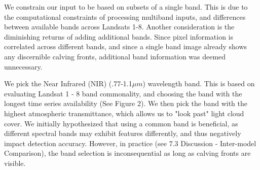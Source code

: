 \documentclass[tc, manuscript]{copernicus}
\begin{document}
We constrain our input to be based on subsets of a single band. This is due to the computational constraints of processing multiband inputs, and differences between available bands across Landsats 1-8. Another consideration is the diminishing returns of adding additional bands. Since pixel information is correlated across different bands, and since a single band image already shows any discernible calving fronts, additional band information was deemed unnecessary.

We pick the Near Infrared (NIR) (.77-1.1$\mu m$) wavelength band. This is based on evaluating  Landsat 1 - 8 band commonality, and choosing the band with the longest time series availability (See Figure 2). We then pick the band with the highest atmospheric transmittance, which allows us to "look past" light cloud cover. We initially hypothesized that using a common band is beneficial, as different spectral bands may exhibit features differently, and thus negatively impact detection accuracy. However, in practice (see 7.3 Discussion - Inter-model Comparison), the band selection is inconsequential as long as calving fronts are visible.

\end{document}
